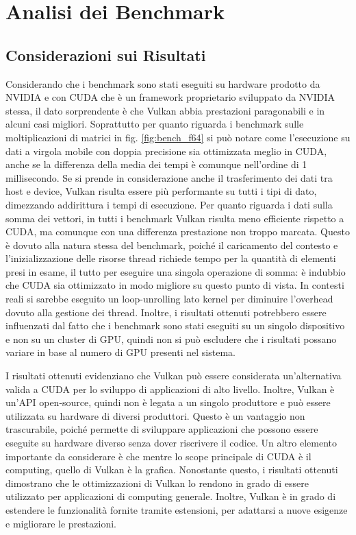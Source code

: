 \chapter{Analisi dei Benchmark}
\label{sec:analisys}

\section{Considerazioni sui Risultati}


Considerando che i benchmark sono stati eseguiti su hardware prodotto da NVIDIA e con CUDA che è un framework proprietario sviluppato da NVIDIA stessa, il dato sorprendente è che Vulkan abbia prestazioni paragonabili e in alcuni casi migliori. Soprattutto per quanto riguarda i benchmark sulle moltiplicazioni di matrici in fig. \ref{fig:bench_f64} si può notare come l'esecuzione su dati a virgola mobile con doppia precisione sia ottimizzata meglio in CUDA, anche se la differenza della media dei tempi è comunque nell'ordine di 1 millisecondo. Se si prende in considerazione anche il trasferimento dei dati tra host e device, Vulkan risulta essere più performante su tutti i tipi di dato, dimezzando addirittura i tempi di esecuzione. Per quanto riguarda i dati sulla somma dei vettori, in tutti i benchmark Vulkan risulta meno efficiente rispetto a CUDA, ma comunque con una differenza prestazione non troppo marcata. Questo è dovuto alla natura stessa del benchmark, poiché il caricamento del contesto e l'inizializzazione delle risorse thread richiede tempo per la quantità di elementi presi in esame, il tutto per eseguire una singola operazione di somma: è indubbio che CUDA sia ottimizzato in modo migliore su questo punto di vista. In contesti reali si sarebbe eseguito un loop-unrolling lato kernel per diminuire l'overhead dovuto alla gestione dei thread. Inoltre, i risultati ottenuti potrebbero essere influenzati dal fatto che i benchmark sono stati eseguiti su un singolo dispositivo e non su un cluster di GPU, quindi non si può escludere che i risultati possano variare in base al numero di GPU presenti nel sistema. 


I risultati ottenuti evidenziano che Vulkan può essere considerata un'alternativa valida a CUDA per lo sviluppo di applicazioni di alto livello. Inoltre, Vulkan è un'API open-source, quindi non è legata a un singolo produttore e può essere utilizzata su hardware di diversi produttori. Questo è un vantaggio non trascurabile, poiché permette di sviluppare applicazioni che possono essere eseguite su hardware diverso senza dover riscrivere il codice. Un altro elemento importante da considerare è che mentre lo scope principale di CUDA è il computing, quello di Vulkan è la grafica. Nonostante questo, i risultati ottenuti dimostrano che le ottimizzazioni di Vulkan lo rendono in grado di essere utilizzato per applicazioni di computing generale. Inoltre, Vulkan è in grado di estendere le funzionalità fornite tramite estensioni, per adattarsi a nuove esigenze e migliorare le prestazioni.



